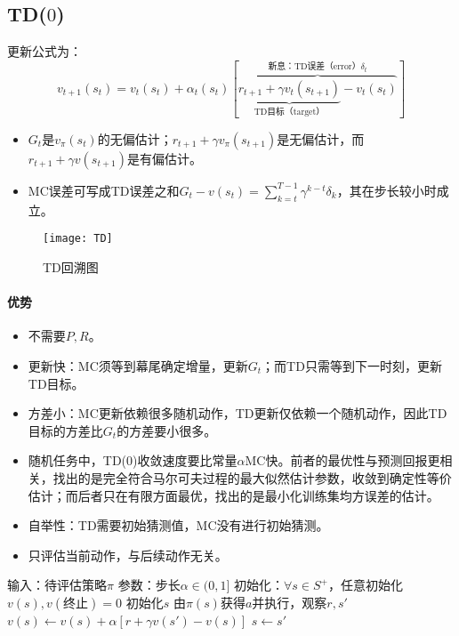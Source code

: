 \documentclass[
12pt, %
a4paper, 
oneside, %
headinclude,footinclude, %
]{scrartcl}
\begin{document}
\subsection[TD($ 0 $)]{TD($ 0 $)}
更新公式为：
$$ v_{t + 1}(s_t) = v_t(s_t) + \alpha_t(s_t)[\overbrace{\underbrace{r_{t + 1} + \gamma v_t(s_{t + 1})}_{\text{TD目标（target）}} - v_t(s_t)}^{\text{新息：TD误差（error）}\delta_t}] $$

\begin{itemize}
\item $ G_t $是$ v_{\pi}(s_t) $的无偏估计；$ r_{t + 1} + \gamma v_{\pi}(s_{t + 1}) $是无偏估计，而$ r_{t + 1} + \gamma v(s_{t + 1}) $是有偏估计。
\item MC误差可写成TD误差之和$ G_t - v(s_t) = \sum_{k = t}^{T - 1} \gamma^{k - t} \delta_k $，其在步长较小时成立。
\end{itemize}

\begin{figure}[H]
\centering
\texttt{[image: TD]}
\caption[TD回溯图]{TD回溯图}
\end{figure}
\paragraph{优势}
\begin{itemize}
\item 不需要$ P,R $。
\item 更新快：MC须等到幕尾确定增量，更新$ G_t $；而TD只需等到下一时刻，更新TD目标。
\item 方差小：MC更新依赖很多随机动作，TD更新仅依赖一个随机动作，因此TD目标的方差比$ G_t $的方差要小很多。
\item 随机任务中，TD($ 0 $)收敛速度要比常量$ \alpha $MC快。前者的最优性与预测回报更相关，找出的是完全符合马尔可夫过程的最大似然估计参数，收敛到确定性等价估计；而后者只在有限方面最优，找出的是最小化训练集均方误差的估计。
\item 自举性：TD需要初始猜测值，MC没有进行初始猜测。
\item 只评估当前动作，与后续动作无关。
\end{itemize}
\begin{myalgorithm}[TD($ 0 $)]
\State 输入：待评估策略$ \pi $
\State 参数：步长$ \alpha \in (0, 1] $
\State 初始化：$ \forall s \in S^+ $，任意初始化$ v(s), v(\text{终止}) = 0 $
\State 初始化$ s $
\State 由$ \pi(s) $获得$ a $并执行，观察$ r, s' $
\State $ v(s) \gets v(s) + \alpha[r + \gamma v(s') - v(s)] $
\State $ s \gets s' $
\EndWhile
\EndFor
\end{myalgorithm}
\end{document}
